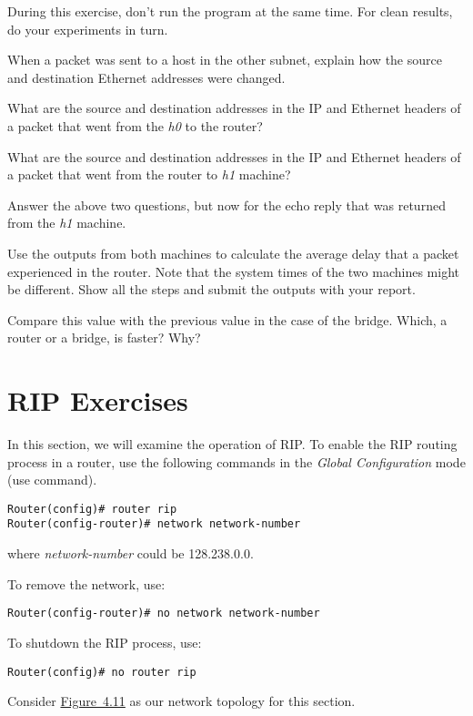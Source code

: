 \documentclass{../UTNetLab}
\begin{document}
During this exercise, don’t run the  program at the same time.
For clean results, do your experiments in turn.

\begin{report}
    \item When a packet was sent to a host in the other subnet, explain how the source and destination Ethernet addresses were changed.

    \item What are the source and destination addresses in the IP and Ethernet headers of a packet that went from the \textit{h0} to the router?

    \item What are the source and destination addresses in the IP and Ethernet headers of a packet that went from the router to \textit{h1} machine?

    \item Answer the above two questions, but now for the echo reply that was returned from the \textit{h1} machine.

    \item Use the  outputs from both machines to calculate the average delay that a packet experienced in the router.
    Note that the system times of the two machines might be different.
    Show all the steps and submit the  outputs with your report.

    \item Compare this value with the previous value in the case of the bridge.
    Which, a router or a bridge, is faster? Why?
\end{report}

\part{RIP Exercises}\label{sec:rip}
In this section, we will examine the operation of RIP.
To enable the RIP routing process in a router, use the following commands in the \textit{Global Configuration} mode (use  command).
\begin{lstlisting}[language={cisco}, emph={network-number}]
Router(config)# router rip
Router(config-router)# network network-number
    \end{lstlisting}
where \textit{network-number} could be 128.238.0.0.

To remove the network, use:
\begin{lstlisting}[language={cisco}, emph={network-number}]
Router(config-router)# no network network-number
    \end{lstlisting}
To shutdown the RIP process, use:
\begin{lstlisting}[language={cisco}]
Router(config)# no router rip
    \end{lstlisting}
Consider \hyperref[fig:4.11]{Figure~4.11} as our network topology for this section.
\end{document}
